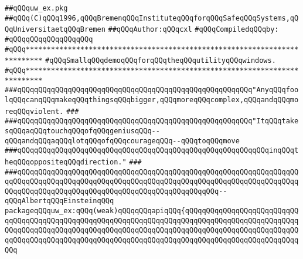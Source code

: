 \label{src/lib/tk/src/toolkit/tests+examples/uw_ex.pkg}
\verb|##qQQquw_ex.pkg|\newline
\verb|##qQQq(C)qQQq1996,qQQqBremenqQQqInstituteqQQqforqQQqSafeqQQqSystems,qQQqUniversitaetqQQqBremen|\newline
\verb|##qQQqAuthor:qQQqcxl|\newline
\newline
\verb|#qQQqCompiledqQQqby:|\newline
\verb|#qQQqqQQqqQQqqQQqqQQq|\newline
\newline
\newline
\newline
\verb|#qQQq**************************************************************************|\newline
\verb|#qQQqSmallqQQqdemoqQQqforqQQqtheqQQqutilityqQQqwindows.|\newline
\verb|#qQQq**************************************************************************|\newline
\newline
\newline
\newline
\verb|###qQQqqQQqqQQqqQQqqQQqqQQqqQQqqQQqqQQqqQQqqQQqqQQqqQQqqQQq"AnyqQQqfoolqQQqcanqQQqmakeqQQqthingsqQQqbigger,qQQqmoreqQQqcomplex,qQQqandqQQqmoreqQQqviolent.|\newline
\verb|###|\newline
\verb|###qQQqqQQqqQQqqQQqqQQqqQQqqQQqqQQqqQQqqQQqqQQqqQQqqQQqqQQq"ItqQQqtakesqQQqaqQQqtouchqQQqofqQQqgeniusqQQq--qQQqandqQQqaqQQqlotqQQqofqQQqcourageqQQq--qQQqtoqQQqmove|\newline
\verb|###qQQqqQQqqQQqqQQqqQQqqQQqqQQqqQQqqQQqqQQqqQQqqQQqqQQqqQQqqQQqinqQQqtheqQQqoppositeqQQqdirection."|\newline
\verb|###|\newline
\verb|###qQQqqQQqqQQqqQQqqQQqqQQqqQQqqQQqqQQqqQQqqQQqqQQqqQQqqQQqqQQqqQQqqQQqqQQqqQQqqQQqqQQqqQQqqQQqqQQqqQQqqQQqqQQqqQQqqQQqqQQqqQQqqQQqqQQqqQQqqQQqqQQqqQQqqQQqqQQqqQQqqQQqqQQqqQQqqQQqqQQqqQQqqQQq--qQQqAlbertqQQqEinsteinqQQq|\newline
\newline
\newline
\newline
\verb|packageqQQquw_ex:qQQq(weak)qQQqqQQqapiqQQq{qQQqqQQqqQQqqQQqqQQqqQQqqQQqqQQqqQQqqQQqqQQqqQQqqQQqqQQqqQQqqQQqqQQqqQQqqQQqqQQqqQQqqQQqqQQqqQQqqQQqqQQqqQQqqQQqqQQqqQQqqQQqqQQqqQQqqQQqqQQqqQQqqQQqqQQqqQQqqQQqqQQqqQQqqQQqqQQqqQQqqQQqqQQqqQQqqQQqqQQqqQQqqQQqqQQqqQQqqQQqqQQqqQQqqQQqqQQqqQQq|\newline
